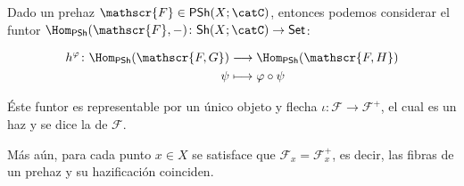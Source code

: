 \begin{prop}
	Dado un prehaz $\mathscr{F} \in \mathsf{PSh}(X; \catC)$, entonces podemos considerar
	el funtor $\Hom_{\mathsf{PSh}}(\mathscr{F}, -) \colon \mathsf{Sh}(X; \catC) \to \mathsf{Set}$:
	\begin{multicols}{2}
		\begin{align*}
			h^\varphi \colon \Hom_{\mathsf{PSh}}(\mathscr{F, G}) &\longrightarrow \Hom_{\mathsf{PSh}}(\mathscr{F, H}) \\
			\psi &\longmapsto \varphi\circ \psi
		\end{align*}
		\begin{center}
		\end{center}
	\end{multicols}
	Éste funtor es representable por un único objeto y flecha $\iota \colon \mathscr{F \to F}^+$,
	el cual es un haz y se dice la  de $\mathscr{F}$.

	Más aún, para cada punto $x \in X$ se satisface que $\mathscr{F}_x = \mathscr{F}_x^+$, es decir, las fibras de un prehaz y su hazificación coinciden.
\end{prop}
